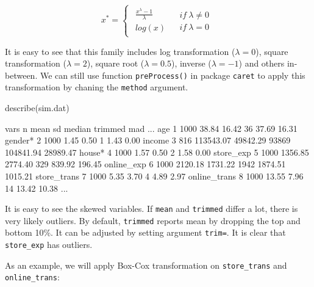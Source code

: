 \documentclass[
  12pt,
]{krantz}
\makeatletter
\newenvironment{Shaded}{\begin{snugshade}}{\end{snugshade}}
\newcommand{\FunctionTok}[1]{\textcolor[rgb]{0,0,0}{#1}}
\newcommand{\NormalTok}[1]{#1}
\newenvironment{kframe}{%
\medskip{}
\setlength{\fboxsep}{.8em}
 \def\at@end@of@kframe{}%
 \ifinner\ifhmode%
  \def\at@end@of@kframe{\end{minipage}}%
  \begin{minipage}{\columnwidth}%
 \fi\fi%
 \def\FrameCommand##1{\hskip\@totalleftmargin \hskip-\fboxsep
 \colorbox{shadecolor}{##1}\hskip-\fboxsep
     \hskip-\linewidth \hskip-\@totalleftmargin \hskip\columnwidth}%
 \MakeFramed {\advance\hsize-\width
   \@totalleftmargin\z@ \linewidth\hsize
   \@setminipage}}%
 {\par\unskip\endMakeFramed%
 \at@end@of@kframe}
\renewenvironment{Shaded}{\begin{kframe}}{\end{kframe}}
\makeatother
\begin{document}
\[
x^{*}=\begin{cases}
\begin{array}{c}
\frac{x^{\lambda}-1}{\lambda}\\
log(x)
\end{array} & \begin{array}{c}
if\ \lambda\neq0\\
if\ \lambda=0
\end{array}\end{cases}
\]

It is easy to see that this family includes log transformation (\(\lambda=0\)), square transformation (\(\lambda=2\)), square root (\(\lambda=0.5\)), inverse (\(\lambda=-1\)) and others in-between. We can still use function \texttt{preProcess()} in package \texttt{caret} to apply this transformation by chaning the \texttt{method} argument.

\begin{Shaded}
\begin{Highlighting}[]
\FunctionTok{describe}\NormalTok{(sim.dat)}
\end{Highlighting}
\end{Shaded}

\begin{Shaded}
\begin{Highlighting}[]
\NormalTok{             vars    n      mean       sd median   trimmed      mad ...}
\NormalTok{age             1 1000     38.84    16.42     36     37.69    16.31}
\NormalTok{gender*         2 1000      1.45     0.50      1      1.43     0.00}
\NormalTok{income          3  816 113543.07 49842.29  93869 104841.94 28989.47}
\NormalTok{house*          4 1000      1.57     0.50      2      1.58     0.00}
\NormalTok{store\_exp       5 1000   1356.85  2774.40    329    839.92   196.45}
\NormalTok{online\_exp      6 1000   2120.18  1731.22   1942   1874.51  1015.21}
\NormalTok{store\_trans     7 1000      5.35     3.70      4      4.89     2.97}
\NormalTok{online\_trans    8 1000     13.55     7.96     14     13.42    10.38}
\NormalTok{...}
\end{Highlighting}
\end{Shaded}

It is easy to see the skewed variables. If \texttt{mean} and \texttt{trimmed} differ a lot, there is very likely outliers. By default, \texttt{trimmed} reports mean by dropping the top and bottom 10\%. It can be adjusted by setting argument \texttt{trim=}. It is clear that \texttt{store\_exp} has outliers.

As an example, we will apply Box-Cox transformation on \texttt{store\_trans} and \texttt{online\_trans}:
\end{document}
